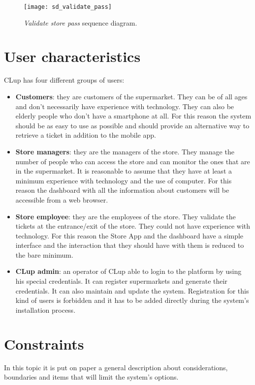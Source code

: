 \begin{figure}[H]
    \centering
    \texttt{[image: sd\_validate\_pass]}
    \caption{\textit{Validate store pass} sequence diagram.}
\end{figure}



\section{User characteristics}
CLup has four different groups of users:
\begin{itemize}
	\item \textbf{Customers}: they are customers of the supermarket. They can be of all ages and don't necessarily have experience with technology. They can also be elderly	people who don't have a smartphone at all. For this reason the system should be as easy to use as possible and should provide an alternative way to retrieve a ticket in addition to the mobile app.
	\item \textbf{Store managers}: they are the managers of the store. They manage the number of people who can access the store and can monitor the ones that are in the supermarket. It is reasonable to assume that they have at least a minimum experience with technology and the use of computer. For this reason the dashboard with all the information about customers will be accessible from a web browser.
	\item \textbf{Store employee}: they are the employees of the store. They validate the tickets at the entrance/exit of the store. They could not have experience with technology. For this reason the Store App and the dashboard have a simple interface and the interaction that they should have with them is reduced to the bare minimum.
    \item \textbf{CLup admin}: an operator of CLup able to login to the platform by using his special credentials. It can register supermarkets and generate their credentials. It can also maintain and update the system. Registration for this kind of users is forbidden and it has to be added directly during the system's installation process.
\end{itemize}

\section{Constraints}
In this topic it is put on paper a general description about considerations, boundaries and items that will limit the system's options.

